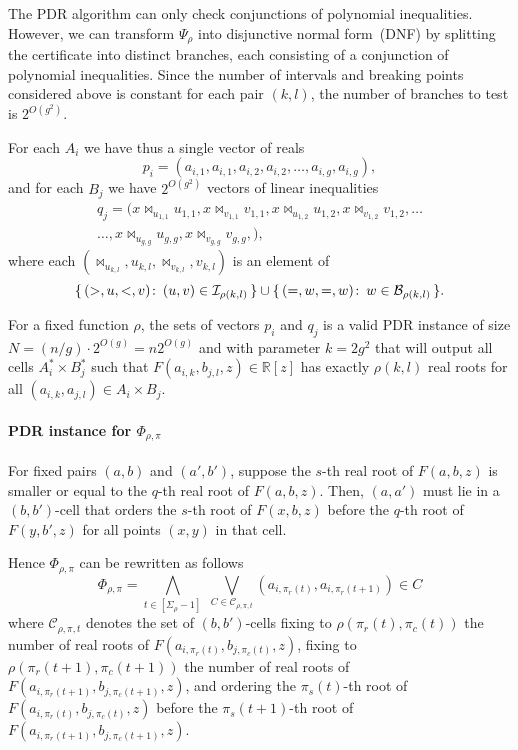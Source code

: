 The PDR algorithm can only check conjunctions of polynomial inequalities.
However, we can transform $\Psi_{\rho}$ into disjunctive normal form~(DNF) by
splitting the certificate into distinct branches, each consisting of a
conjunction of polynomial inequalities.
Since the number of intervals and breaking points
considered above is constant for each pair $(k,l)$, the number of branches to
test is $2^{O(g^2)}$.

For each $A_i$ we have thus a single vector of reals
\begin{displaymath}
	p_i = (
		a_{i,1} , a_{i,1},
		a_{i,2}, a_{i,2},
		\ldots,
		a_{i,g} , a_{i,g}
	),
\end{displaymath}
and for each $B_j$ we have $2^{O(g^2)}$ vectors of linear inequalities
\begin{multline*}
	q_j = (
		x \bowtie_{u_{1,1}} u_{1,1}, x \bowtie_{v_{1,1}} v_{1,1},
		x \bowtie_{u_{1,2}} u_{1,2}, x \bowtie_{v_{1,2}} v_{1,2},
		\ldots \\
		\ldots ,
		x \bowtie_{u_{g,g}} u_{g,g}, x \bowtie_{v_{g,g}} v_{g,g},
	),
\end{multline*}
where each $(\bowtie_{u_{k,l}}, u_{k,l}, \bowtie_{v_{k,l}}, v_{k,l})$ is an element of
\begin{displaymath}
	\{\, ( > , u , < , v ) \colon\, (u,v) \in \mathcal{I}_{\rho(k,l)}\,\}
	\cup
	\{\, ( = , w , = , w ) \colon\, w \in \mathcal{B}_{\rho(k,l)}\,\}.
\end{displaymath}

For a fixed function $\rho$,
the sets of vectors $p_i$ and $q_j$ is a valid PDR instance
of size $N = (n/g) \cdot 2^{O(g)} = n2^{O(g)}$ and with parameter $k = 2g^2$
that will
output all cells $A^*_i \times B^*_j$ such that $F(a_{i,k},b_{j,l},z) \in
\mathbb{R}[z]$ has exactly $\rho(k,l)$ real roots for all $(a_{i,k},a_{j,l}) \in A_i
\times B_j$.

\paragraph{PDR instance for $\Phi_{\rho,\pi}$}

For fixed pairs $(a,b)$ and $(a',b')$, suppose the $s$-th real root of
$F(a,b,z)$ is smaller or equal to the $q$-th real root of $F(a,b,z)$. Then,
$(a,a')$ must lie in a $(b,b')$-cell that orders the $s$-th root of $F(x,b,z)$
before the $q$-th root of $F(y,b',z)$ for all points $(x,y)$ in that cell.

Hence $\Phi_{\rho,\pi}$ can be rewritten as follows
\begin{displaymath}
	\Phi_{\rho,\pi} =
	\bigwedge_{t\in[\Sigma_\rho-1]}\,\,
	\bigvee_{C \in \mathcal{C}_{\rho,\pi,t}}
	( a_{i,\pi_r(t)}, a_{i,\pi_r(t+1)} ) \in C
\end{displaymath}
where $\mathcal{C}_{\rho,\pi,t}$ denotes the set of $(b,b')$-cells
fixing to $\rho(\pi_r(t),\pi_c(t))$ the number of real roots of
$F(a_{i,\pi_r(t)},b_{j,\pi_c(t)},z)$,
fixing to $\rho(\pi_r(t+1), \pi_c(t+1))$
the number of real roots of $F(a_{i,\pi_r(t+1)},b_{j,\pi_c(t+1)},z)$,
and ordering the $\pi_s(t)$-th root of $F(a_{i,\pi_r(t)},b_{j,\pi_c(t)},z)$
before the $\pi_s(t+1)$-th root of $F(a_{i,\pi_r(t+1)},b_{j,\pi_c(t+1)},z)$.

